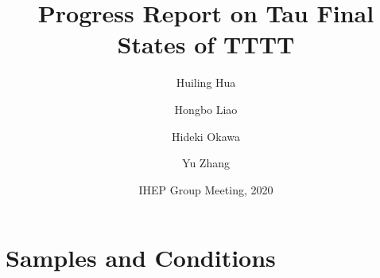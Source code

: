 \documentclass{beamer}
\title[IHEP Group Meeting] %
{Progress Report on Tau Final States of TTTT}
\author[Huiling Hua] %
{Huiling Hua\inst{1} \and Hongbo Liao\inst{1} \and Hideki Okawa\inst{2} \and Yu    Zhang\inst{2}}
\institute[IHEP] %
{
  \inst{1}%
    IHEP
  \and
  \inst{2}%
    Fudan University
}
\date[IHEP 2020] %
{IHEP Group Meeting, 2020}
\begin{document}
\begin{frame}
  \titlepage
\end{frame}









\section{Samples and Conditions}
\end{document}
